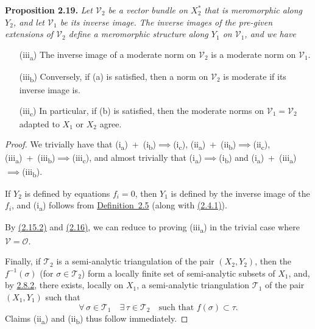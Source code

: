 \documentclass{report}
\newenvironment{itenv}[1]
  {\phantomsection\par\medskip\noindent\textbf{#1.}\itshape}
  {\medskip}
\newcommand{\scr}[1]{{\mathscr{#1}}}
\renewcommand{\cal}[1]{{\mathcal{#1}}}
\newcommand{\oldpage}[1]{\marginpar{\footnotesize$\Big\vert$ \textit{p.~#1}}}
\begin{document}
\begin{itenv}{Proposition 2.19}
  Let $\cal{V}_2$ be a vector bundle on $X_2^*$ that is meromorphic along $Y_2$, and let $\cal{V}_1$ be its inverse image.
  The inverse images of the pre-given extensions of $\cal{V}_2$ define a meromorphic structure along $Y_1$ on $\cal{V}_1$, and we have
  \begin{enumerate}
    \item[{\rm(iii\textsubscript{a})}] The inverse image of a moderate norm on $\cal{V}_2$ is a moderate norm on $\cal{V}_1$.
    \item[{\rm(iii\textsubscript{b})}] Conversely, if {\rm(a)} is satisfied, then a norm on $\cal{V}_2$ is moderate if its inverse image is.
    \item[{\rm(iii\textsubscript{c})}] In particular, if {\rm(b)} is satisfied, then the moderate norms on $\cal{V}_1=\cal{V}_2$ adapted to $X_1$ or $X_2$ agree.
  \end{enumerate}
\end{itenv}

\begin{proof}
  We trivially have that \mbox{(i\textsubscript{a})~+~(i\textsubscript{b})$\implies$(i\textsubscript{c})}, \mbox{(ii\textsubscript{a})~+~(ii\textsubscript{b})$\implies$(ii\textsubscript{c})}, \mbox{(iii\textsubscript{a})~+~(iii\textsubscript{b})$\implies$(iii\textsubscript{c})}, and almost trivially that \mbox{(i\textsubscript{a})$\implies$(i\textsubscript{b})} and \mbox{(i\textsubscript{a})~+~(iii\textsubscript{a})$\implies$(iii\textsubscript{b})}.

  If $Y_2$ is defined by equations $f_i=0$, then $Y_1$ is defined by the inverse image of the $f_i$, and (i\textsubscript{a}) follows from \hyperref[II.2.5]{Definition~2.5} (along with \hyperref[II.2.4.1]{(2.4.1)}).

  By \hyperref[II.2.15.2]{(2.15.2)} and \hyperref[II.2.16]{(2.16)}, we can reduce to proving (iii\textsubscript{a}) in the trivial case where $\cal{V}=\cal{O}$.

\oldpage{70}
  Finally, if $\scr{T}_2$ is a semi-analytic triangulation of the pair $(X_2,Y_2)$, then the $f^{-1}(\sigma)$ (for $\sigma\in\scr{T}_2$) form a locally finite set of semi-analytic subsets of $X_1$, and, by \hyperref[II.2.8.2]{2.8.2}, there exists, locally on $X_1$, a semi-analytic triangulation $\scr{T}_1$ of the pair $(X_1,Y_1)$ such that
  \[
    \forall\,\sigma\in\scr{T}_1
    \quad
    \exists\,\tau\in\scr{T}_2
    \quad
    \mbox{such that $f(\sigma)\subset\tau$}.
  \]
  Claims {\rm(ii\textsubscript{a})} and {\rm(ii\textsubscript{b})} thus follow immediately.
\end{proof}
\end{document}
